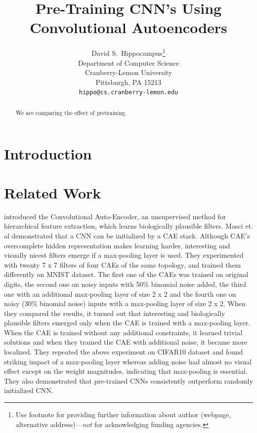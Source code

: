 \documentclass[draft]{article}
\title{Pre-Training CNN's Using Convolutional Autoencoders}
\author{
  David S.~Hippocampus\thanks{Use footnote for providing further
    information about author (webpage, alternative
    address)---\emph{not} for acknowledging funding agencies.} \\
  Department of Computer Science\\
  Cranberry-Lemon University\\
  Pittsburgh, PA 15213 \\
  \texttt{hippo@cs.cranberry-lemon.edu} \\
}
\begin{document}

\maketitle

\begin{abstract}
  We are comparing the effect of pretraining.
\end{abstract}

\section{Introduction}
\section{Related Work}
\cite{masci11} introduced the Convolutional Auto-Encoder, an unsupervised method for hierarchical feature extraction, which learns biologically plausible filters. Masci et. al demonstrated that a CNN can be initialized by a CAE stack. Although CAE’s overcomplete hidden representation makes learning harder,  interesting and visually nicest filters emerge if a max-pooling layer is used. They experimented with twenty 7 x 7 filters of four CAEs of the same topology, and trained them differently on MNIST dataset. The first one of the CAEs was trained on original digits, the second one on noisy inputs with 50\% binomial noise added, the third one with an additional max-pooling layer of size 2 x 2 and the fourth one on noisy (30\% binomial noise) inputs with a max-pooling layer of size 2 x 2. When they compared the results, it turned out that interesting and biologically plausible filters emerged only when the CAE is trained with a max-pooling layer. When the CAE is trained without any additional constraints, it learned trivial solutions and when they trained the CAE with additional noise, it became more localized. They repeated the above experiment on CIFAR10 dataset and found striking impact of a max-pooling layer whereas adding noise had almost no visual effect except on the weight magnitudes, indicating that max-pooling is essential. They also demonstrated that pre-trained CNNs consistently outperform randomly initialized CNN.
\end{document}
